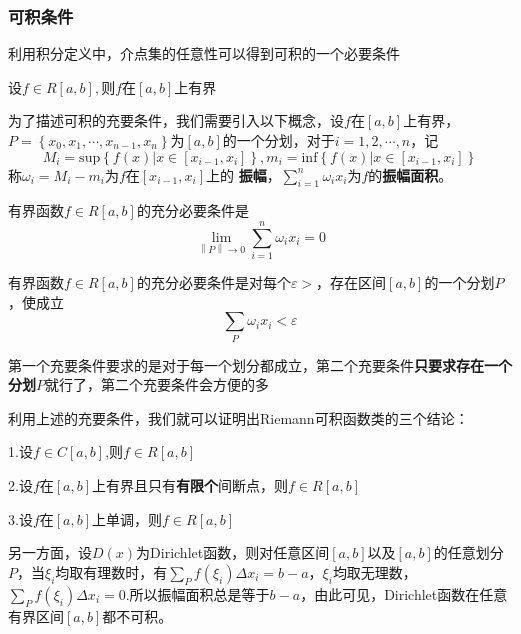 \documentclass[lang=cn,10pt]{elegantbook}
\begin{document}
\subsubsection{可积条件}
利用积分定义中，介点集的任意性可以得到可积的一个必要条件
\begin{proposition}
	设$f\in R[a,b],$则$f$在$[a,b]$上有界
\end{proposition}
为了描述可积的充要条件，我们需要引入以下概念，设$f$在$[a,b]$上有界，$P=\left\{ x_0,x_1,\cdots ,x_{n-1},x_n \right\} $为$[a,b]$的一个分划，对于$i=1,2,\cdots ,n$，记
\begin{equation*}
	M_i=\mathrm{sup}\left\{ f\left( x \right) |x\in \left[ x_{i-1},x_i \right] \right\} ,m_i=\mathrm{inf}\left\{ f\left( x \right) |x\in \left[ x_{i-1},x_i \right] \right\} 
\end{equation*}
称$\omega _i=M_i-m_i\text{为}f\text{在}\left[ x_{i-1},x_i \right] \text{上的}$ \textbf{振幅}$\text{，}\sum_{i=1}^n{\omega _ix_i}\text{为}f\text{的}$\textbf{振幅面积}。

\begin{proposition}[可积的第一充分必要条件]
	有界函数$f\in R[a,b]$的充分必要条件是
	\begin{equation*}
		\underset{\left\| P \right\| \rightarrow 0}{\lim}\sum_{i=1}^n{\omega _ix_i}=0
	\end{equation*}
\end{proposition}
\begin{proposition}[可积的第一充分必要条件]
	有界函数$f\in R[a,b]$的充分必要条件是对每个$\varepsilon>$，存在区间$[a,b] $的一个分划$P$，使成立
	\begin{equation*}
		\sum_P{\omega _ix_i}<\varepsilon 
	\end{equation*}
\end{proposition}
\begin{remark}
	第一个充要条件要求的是对于每一个划分都成立，第二个充要条件\textbf{只要求存在一个分划}$P$就行了，第二个充要条件会方便的多
\end{remark}
利用上述的充要条件，我们就可以证明出Riemann可积函数类的三个结论：
\begin{conclusion}
	
	1.设$f\in C[a,b]$,则$f \in R[a,b]$
	
	2.设$f$在$[a,b]$上有界且只有\textbf{有限个}间断点，则$f \in R[a,b]$
	
	3.设$f$在$[a,b]$上单调，则$f \in R[a,b]$
\end{conclusion}

另一方面，设$D(x)$为Dirichlet函数，则对任意区间$[a,b]$以及$[a,b]$的任意划分$P$，当$\xi_{i}$均取有理数时，有$\sum_P{f\left( \xi _i \right) \varDelta x_i=b-a}$，$\xi_{i}$均取无理数，$\sum_P{f\left( \xi _i \right) \varDelta x_i=0}$.所以振幅面积总是等于$b-a$，由此可见，Dirichlet函数在任意有界区间$[a,b]$都不可积。
\end{document}

